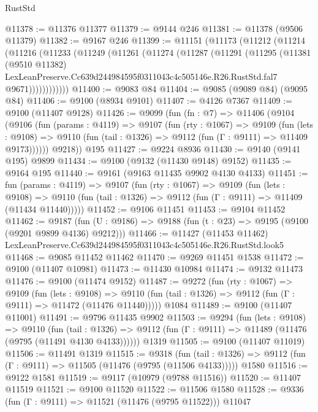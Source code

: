 \begin{lexlean}{RustStd}
\begin{coremodule}
@11378 := @11376 @11377
@11379 := @9144 @246
@11381 := @11378 (@9506 @11379)
@11382 := @9167 @246
@11399 := @11151
    (@11173
      (@11212
        (@11214
          (@11216
            (@11233
              (@11249
                (@11261
                  (@11274
                    (@11287
                      (@11291
                        (@11295
                          (@11381
                            (@9510 @11382)
                            LexLeanPreserve.Cc639d244984595f0311043c4c505146e.R26.RustStd.fal7
                            @9671))))))))))))
@11400 := @9083 @84
@11404 := @9085 (@9089 @84) (@9095 @84)
@11406 := @9100 (@8934 @9101)
@11407 := @4126 @7367
@11409 := @9100 (@11407 @9128)
@11426 := @9099
    (fun (fn : @7) =>
    @11406
      (@9104
        (@9106
          (fun (params : @4119) =>
          @9107
            (fun (rty : @1067) =>
            @9109
              (fun (lets : @9108) =>
              @9110 (fun (tail : @1326) => @9112 (fun (Γ : @9111) => @11409 @9173))))))
        @9218))
    @195
@11427 := @9224 @8936
@11430 := @9140 (@9141 @195) @9899
@11434 := @9100 (@9132 (@11430 @9148) @9152)
@11435 := @9164 @195
@11440 := @9161 (@9163 @11435 @9902 @4130 @4133)
@11451 := fun (params : @4119) =>
  @9107
    (fun (rty : @1067) =>
    @9109
      (fun (lets : @9108) =>
      @9110 (fun (tail : @1326) => @9112 (fun (Γ : @9111) => @11409 (@11434 @11440)))))
@11452 := @9106 @11451
@11453 := @9104 @11452
@11462 := @9187
    (fun (U : @9186) => @9188 (fun (t : @23) => @9195 (@9100 (@9201 @9899 @4136) @9212)))
@11466 := @11427 (@11453 @11462) LexLeanPreserve.Cc639d244984595f0311043c4c505146e.R26.RustStd.look5
@11468 := @9085 @11452 @11462
@11470 := @9269 @11451 @1538
@11472 := @9100 (@11407 @10981)
@11473 := @11430 @10984
@11474 := @9132 @11473
@11476 := @9100 (@11474 @9152)
@11487 := @9272
    (fun (rty : @1067) =>
    @9109
      (fun (lets : @9108) =>
      @9110 (fun (tail : @1326) => @9112 (fun (Γ : @9111) => @11472 (@11476 @11440)))))
    @1084
@11489 := @9100 (@11407 @11001)
@11491 := @9796 @11435 @9902
@11503 := @9294
    (fun (lets : @9108) =>
    @9110
      (fun (tail : @1326) =>
      @9112 (fun (Γ : @9111) => @11489 (@11476 (@9795 (@11491 @4130 @4133))))))
    @1319
@11505 := @9100 (@11407 @11019)
@11506 := @11491 @1319
@11515 := @9318
    (fun (tail : @1326) => @9112 (fun (Γ : @9111) => @11505 (@11476 (@9795 (@11506 @4133)))))
    @1580
@11516 := @9122 @1581
@11519 := @9117 (@10979 (@9788 @11516))
@11520 := @11407 @11519
@11521 := @9100 @11520
@11522 := @11506 @1580
@11528 := @9336 (fun (Γ : @9111) => @11521 (@11476 (@9795 @11522))) @11047

\end{coremodule}
\end{lexlean}
